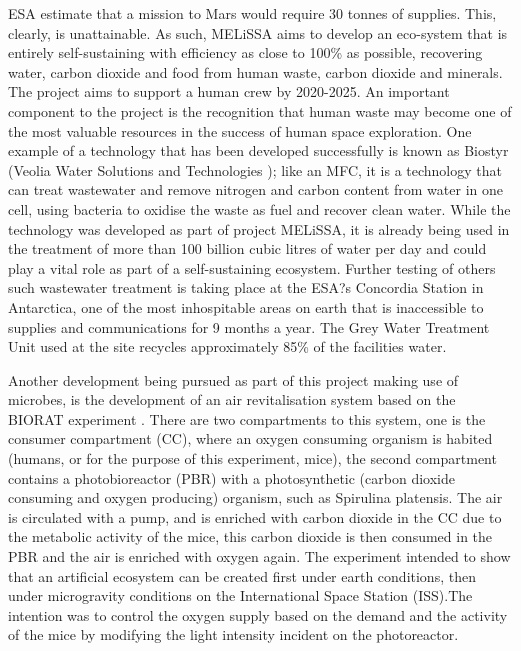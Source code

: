 \documentclass[12pt]{article}
\begin{document}
ESA estimate that a mission to Mars would require 30 tonnes of supplies. This, clearly, is unattainable. As such, MELiSSA aims to develop an eco-system that is entirely self-sustaining with efficiency as close to 100\% as possible, recovering water, carbon dioxide and food from human waste, carbon dioxide and minerals. The project aims to support a human crew by 2020-2025. An important component to the project is the recognition that human waste may become one of the most valuable resources in the success of human space exploration. One example of a technology that has been developed successfully is known as Biostyr (Veolia Water Solutions and Technologies \cite{veolia}); like an MFC, it is a technology that can treat wastewater and remove nitrogen and carbon content from water in one cell, using bacteria to oxidise the waste as fuel and recover clean water. While the technology was developed as part of project MELiSSA, it is already being used in the treatment of more than 100 billion cubic litres of water per day and could play a vital role as part of a self-sustaining ecosystem. Further testing of others such wastewater treatment is taking place at the ESA?s Concordia Station in Antarctica, one of the most inhospitable areas on earth that is inaccessible to supplies and communications for 9 months a year.  The Grey Water Treatment Unit used at the site recycles approximately 85\% of the facilities water. \cite{salem2009coldest}

Another development being pursued as part of this project making use of microbes, is the development of an air revitalisation system based on the BIORAT experiment \cite{agency2000exemple}. There are two compartments to this system, one is the consumer compartment (CC), where an oxygen consuming organism is habited (humans, or for the purpose of this experiment, mice), the second compartment contains a photobioreactor (PBR) with a photosynthetic (carbon dioxide consuming and oxygen producing) organism, such as Spirulina platensis. The air is circulated with a pump, and is enriched with carbon dioxide in the CC due to the metabolic activity of the mice, this carbon dioxide is then consumed in the PBR and the air is enriched with oxygen again. The experiment intended to show that an artificial ecosystem can be created first under earth conditions, then under microgravity conditions on the International Space Station (ISS).The intention was to control the oxygen supply based on the demand and the activity of the mice by modifying the light intensity incident on the photoreactor. 
\end{document}
